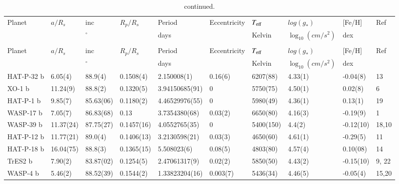 \begin{subappendices}
{\begin{landscape}
\begin{longtable}{llllllllll}
  \hline\hline
  Planet & $a/R_s$ & inc & $R_p/R_s$ & Period &  Eccentricity &        $T_{\rm eff}$ & $log(g_*)$ & [Fe/H] & Ref  \\
   &  & $^{\circ}$ &  & days &   & Kelvin & $\log_{10}(cm/s^2)$ & dex &          \\
  \hline
  \endfirsthead
  \caption{continued.} \\
  \hline\hline
  Planet & $a/R_s$ & inc & $R_p/R_s$ & Period &  Eccentricity &        $T_{\rm eff}$ & $log(g_*)$ & [Fe/H] & Ref  \\
   &  & $^{\circ}$ &  & days &   & Kelvin & $\log_{10}(cm/s^2)$ & dex &          \\
  \hline
  \endhead
  \hline
  \endfoot
  HAT-P-32 b    &   6.05(4) &     88.9(4) &       0.1508(4) &         2.150008(1) &       0.16(6) &   6207(88) &      4.33(1) &  -0.04(8) &                                13          \\
  XO-1 b       &  11.24(9) &    88.8(2) &       0.1320(5) &         3.94150685(91) &    0 &         5750(75) &      4.50(1) &   0.02(8) &                                  6 \\
  HAT-P-1 b     &   9.85(7) &    85.63(06) &     0.1180(2) &         4.46529976(55) &    0 &         5980(49) &      4.36(1) &   0.13(1) &                                19       \\
  WASP-17 b    &   7.05(7) &    86.83(68) &     0.13 &              3.7354380(68) &     0.03(2) &   6650(80) &      4.16(3) &  -0.19(9) &                               1        \\
  WASP-39 b    &  11.37(24) &   87.75(27) &     0.1457(16) &        4.0552765(35) &     0 &         5400(150) &     4.4(2) &   -0.12(10) &                            18,10      \\
  HAT-P-12 b    &  11.77(21) &   89.0(4) &       0.1406(13) &        3.2130598(21) &     0.03(3) &   4650(60) &      4.61(1) &  -0.29(5) &                               11      \\
  HAT-P-18 b    &  16.04(75) &   88.8(3) &       0.1365(15) &        5.508023(6) &       0.08(5) &   4803(80) &      4.57(4) &    0.10(08) &                                14    \\
  TrES2 b     &    7.90(2) &   83.87(02) &     0.1254(5) &         2.47061317(9) &     0.02(2) &   5850(50) &      4.43(2) &   -0.15(10) &                                9, 22   \\
  WASP-4 b     &   5.46(2) &    88.52(39) &     0.1544(2) &         1.33823204(16) &    0.003(7) &  5436(34) &      4.46(5) &  -0.05(4) &                                  15,20    \\

\end{longtable}
\end{landscape}}
\end{subappendices}
